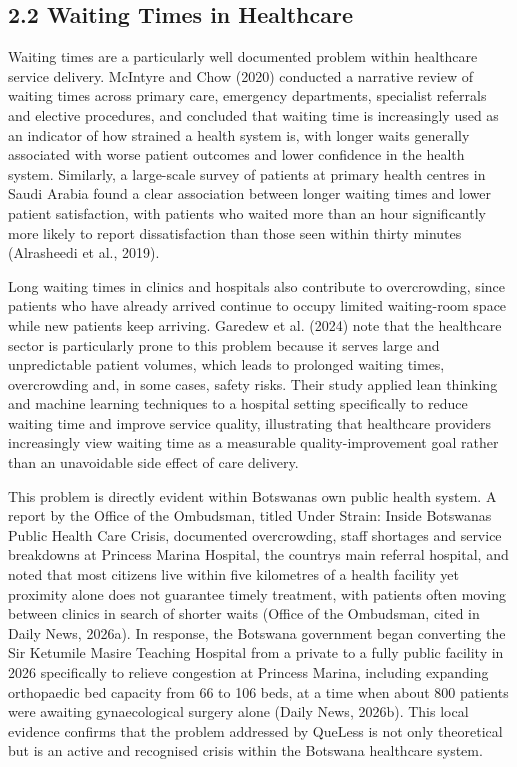 \documentclass[
]{article}
\begin{document}
\subsection{2.2 Waiting Times in
Healthcare}\label{waiting-times-in-healthcare}

Waiting times are a particularly well documented problem within
healthcare service delivery. McIntyre and Chow (2020) conducted a
narrative review of waiting times across primary care, emergency
departments, specialist referrals and elective procedures, and concluded
that waiting time is increasingly used as an indicator of how strained a
health system is, with longer waits generally associated with worse
patient outcomes and lower confidence in the health system. Similarly, a
large-scale survey of patients at primary health centres in Saudi Arabia
found a clear association between longer waiting times and lower patient
satisfaction, with patients who waited more than an hour significantly
more likely to report dissatisfaction than those seen within thirty
minutes (Alrasheedi et al., 2019).

Long waiting times in clinics and hospitals also contribute to
overcrowding, since patients who have already arrived continue to occupy
limited waiting-room space while new patients keep arriving. Garedew et
al. (2024) note that the healthcare sector is particularly prone to this
problem because it serves large and unpredictable patient volumes, which
leads to prolonged waiting times, overcrowding and, in some cases,
safety risks. Their study applied lean thinking and machine learning
techniques to a hospital setting specifically to reduce waiting time and
improve service quality, illustrating that healthcare providers
increasingly view waiting time as a measurable quality-improvement goal
rather than an unavoidable side effect of care delivery.

This problem is directly evident within Botswana\textquotesingle s own
public health system. A report by the Office of the Ombudsman, titled
Under Strain: Inside Botswana\textquotesingle s Public Health Care
Crisis, documented overcrowding, staff shortages and service breakdowns
at Princess Marina Hospital, the country\textquotesingle s main referral
hospital, and noted that most citizens live within five kilometres of a
health facility yet proximity alone does not guarantee timely treatment,
with patients often moving between clinics in search of shorter waits
(Office of the Ombudsman, cited in Daily News, 2026a). In response, the
Botswana government began converting the Sir Ketumile Masire Teaching
Hospital from a private to a fully public facility in 2026 specifically
to relieve congestion at Princess Marina, including expanding
orthopaedic bed capacity from 66 to 106 beds, at a time when about 800
patients were awaiting gynaecological surgery alone (Daily News, 2026b).
This local evidence confirms that the problem addressed by QueLess is
not only theoretical but is an active and recognised crisis within the
Botswana healthcare system.
\end{document}
